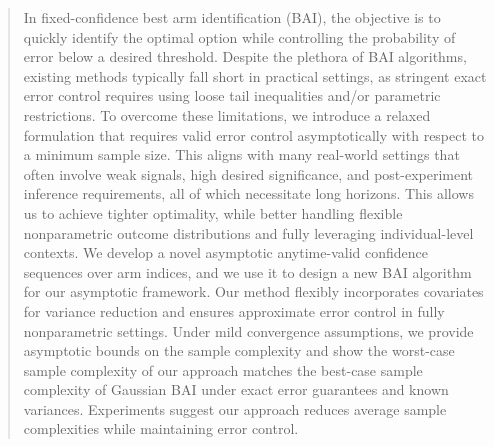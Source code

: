 \documentclass{article}
\begin{document}
\begin{abstract}
In fixed-confidence best arm identification (BAI), the objective is to quickly identify the optimal option while controlling the probability of error below a desired threshold. Despite the plethora of BAI algorithms, existing methods typically fall short in practical settings, as stringent exact error control requires using loose tail inequalities and/or parametric restrictions. To overcome these limitations, we introduce a relaxed formulation that requires valid error control asymptotically with respect to a minimum sample size. This aligns with many real-world settings that often involve weak signals, high desired significance, and post-experiment inference requirements, all of which necessitate long horizons. This allows us to achieve tighter optimality, while better handling flexible nonparametric outcome distributions and fully leveraging individual-level contexts.
We develop a novel asymptotic anytime-valid confidence sequences over arm indices, and we use it to design a new BAI algorithm for our asymptotic framework. Our method flexibly incorporates covariates for variance reduction and ensures approximate error control in fully nonparametric settings. Under mild convergence assumptions, we provide asymptotic bounds on the sample complexity and show the worst-case sample complexity of our approach matches the best-case sample complexity of Gaussian BAI under exact error guarantees and known variances. Experiments suggest our approach reduces average sample complexities while maintaining error control.  
\end{abstract}
\end{document}
